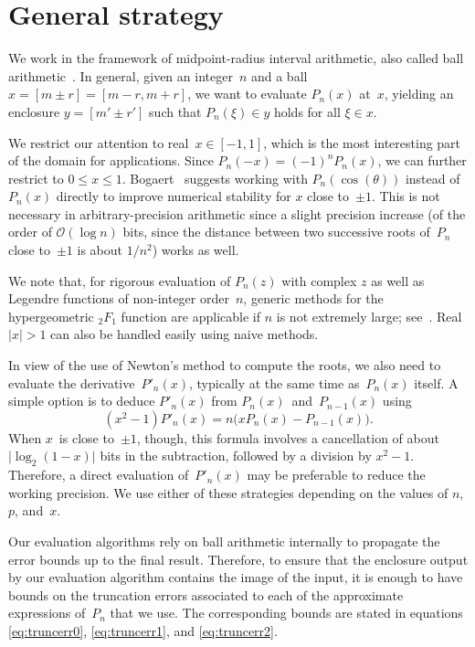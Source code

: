 \documentclass[nohypdvips,review]{siamart0216}
\newcommand{\abs}[1]{\mathopen| #1 \mathclose|}
\newcommand{\OO}{\mathcal{O}}
\begin{document}
\section{General strategy}

\label{sec:general}

We work in the framework of midpoint-radius interval arithmetic,
also called ball arithmetic~\cite{vdH:ball,Johansson2017arb}.
In general, given an integer~$n$ and a ball $x = [m \pm r] = [m-r, m+r]$,
we want to evaluate $P_n(x)$ at~$x$,
yielding an enclosure $y = [m' \pm r']$ such that $P_n(\xi) \in y$
holds for all $\xi \in x$.

We restrict our attention to real~$x \in [-1, 1]$,
which is the most interesting part of the domain for applications.
Since $P_n(-x) = (-1)^n P_n(x)$, we can further
restrict to $0 \le x \le 1$.
Bogaert~\cite{bogaert2014iteration} suggests
working with $P_n(\cos(\theta))$ instead of $P_n(x)$
directly to improve numerical stability for $x$ close to~$\pm 1$.
This is not necessary in arbitrary-precision arithmetic since
a slight precision increase (of the order of $\OO(\log n)$ bits, since
the distance between two successive roots of~$P_n$ close to~$\pm1$ is
about $1/n^2$) works as well.

We note that, for rigorous evaluation of $P_n(z)$ with complex $z$
as well as Legendre functions of non-integer order $n$,
generic methods for the hypergeometric ${}_2F_1$ function
are applicable if $n$ is not extremely large; see~\cite{johansson2016hypergeometric}.
Real $|x| > 1$ can also be handled easily using naive methods.

In view of the use of Newton's method to compute the roots,
we also need to evaluate the derivative $P'_n(x)$,
typically at the same time as $P_n(x)$ itself.
A simple option is to deduce $P'_n(x)$ from
$P_n(x)$ and $P_{n-1}(x)$ using
\begin{equation} \label{eq:mixed}
  (x^2 - 1) P'_n(x) = n \bigl( x P_n(x) - P_{n-1}(x) \bigl).
\end{equation}
When $x$ is close to~$\pm 1$, though, this formula involves a
cancellation of about $\abs{\log_2(1 - x)}$ bits in the subtraction,
followed by a division by $x^2 - 1$.
Therefore, a direct evaluation of $P'_n(x)$ may be preferable to reduce
the working precision.
We use either of these strategies depending on the values of
$n$, $p$, and~$x$.

Our evaluation algorithms rely on ball arithmetic internally to
propagate the error bounds up to the final result.
Therefore, to ensure that the enclosure output by our evaluation
algorithm contains the image of the input, it is enough to have bounds
on the truncation errors associated to each of the approximate
expressions of~$P_n$ that we use.
The corresponding bounds are stated in equations \cref{eq:truncerr0},
\cref{eq:truncerr1}, and \cref{eq:truncerr2}.
\end{document}
